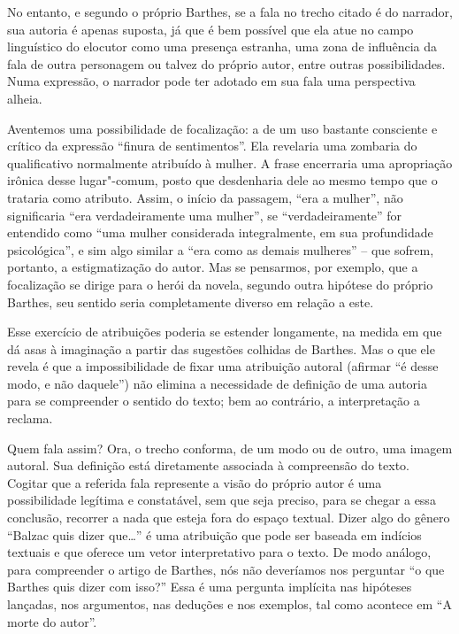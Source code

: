 No entanto, e segundo o próprio Barthes, se a fala no trecho citado é do
narrador, sua autoria é apenas suposta, já que é bem possível que ela
atue no campo linguístico do elocutor como uma presença estranha, uma
zona de influência da fala de outra personagem ou talvez do próprio
autor, entre outras possibilidades. Numa expressão, o narrador pode ter
adotado em sua fala uma perspectiva alheia.

Aventemos uma possibilidade de focalização: a de um uso bastante
consciente e crítico da expressão ``finura de sentimentos''. Ela
revelaria uma zombaria do qualificativo normalmente atribuído à mulher.
A frase encerraria uma apropriação irônica desse lugar"-comum, posto que
desdenharia dele ao mesmo tempo que o trataria como atributo. Assim,
o início da passagem, ``era a mulher'', não significaria ``era
verdadeiramente uma mulher'', se ``verdadeiramente'' for entendido como
``uma mulher considerada integralmente, em sua profundidade
psicológica'', e sim algo similar a ``era como as demais mulheres'' --
que sofrem, portanto, a estigmatização do autor. Mas se pensarmos, por
exemplo, que a focalização se dirige para o herói da novela, segundo
outra hipótese do próprio Barthes, seu sentido seria completamente
diverso em relação a este.

Esse exercício de atribuições poderia se estender longamente, na medida
em que dá asas à imaginação a partir das sugestões colhidas de Barthes.
Mas o que ele revela é que a impossibilidade de fixar uma atribuição
autoral (afirmar ``é desse modo, e não daquele'') não elimina a
necessidade de definição de uma autoria para se compreender o sentido do
texto; bem ao contrário, a interpretação a reclama.

Quem fala assim? Ora, o trecho conforma, de um modo ou de outro, uma
imagem autoral. Sua definição está diretamente associada à compreensão
do texto. Cogitar que a referida fala represente a visão do próprio
autor é uma possibilidade legítima e constatável, sem que seja preciso,
para se chegar a essa conclusão, recorrer a nada que esteja fora do
espaço textual. Dizer algo do gênero ``Balzac quis dizer que\ldots{}'' é uma
atribuição que pode ser baseada em indícios textuais e que oferece um
vetor interpretativo para o texto. De modo análogo, para compreender o
artigo de Barthes, nós não deveríamos nos perguntar ``o que Barthes quis
dizer com isso?'' Essa é uma pergunta implícita nas hipóteses lançadas,
nos argumentos, nas deduções e nos exemplos, tal como acontece em ``A
morte do autor''.

